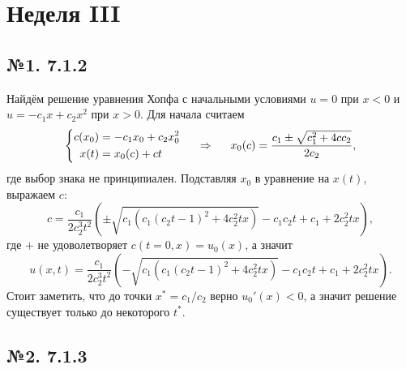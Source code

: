 \section{Неделя III}


\subsection*{№1. 7.1.2}

Найдём решение уравнения Хопфа с начальными условиями $u = 0$ при $x < 0$ и $u = -c_1 x + c_2 x^2$ при $x > 0$. Для начала считаем
\begin{equation*}
    \left\{\begin{aligned}
        c(x_0) &= - c_1 x_0 + c_2 x_0^2  \\
        x(t) &= x_0 (c) + c t
    \end{aligned}\right.
    \hspace{0.5cm} \Rightarrow \hspace{0.5cm}
    x_0 (c) = \frac{c_1 \pm \sqrt{c_1^2 + 4 c c_2}}{2 c_2},
\end{equation*}
где выбор знака не принципиален. Подставляя $x_0$ в уравнение на $x(t)$, выражаем $c$:
\begin{equation*}
    c = \frac{c_1}{2 c_2^3 t^2} \left(
        \pm \sqrt{c_1 \left(c_1 (c_2 t-1)^2+4 c_2^2 t x\right)}-c_1 c_2 t+c_1+2 c_2^2 t x
    \right),
\end{equation*}
где $+$ не удоволетворяет $c(t=0, x) = u_0 (x)$, а значит
\begin{equation*}
    u(x, t) = \frac{c_1}{2 c_2^3 t^2} \left(
        - \sqrt{c_1 \left(c_1 (c_2 t-1)^2+4 c_2^2 t x\right)}-c_1 c_2 t+c_1+2 c_2^2 t x
    \right).
\end{equation*} 
Стоит заметить, что до точки $x^* = c_1/c_2$ верно $u_0'(x) < 0$, а значит решение существует только до некоторого $t^*$. 


\subsection*{№2. 7.1.3}

